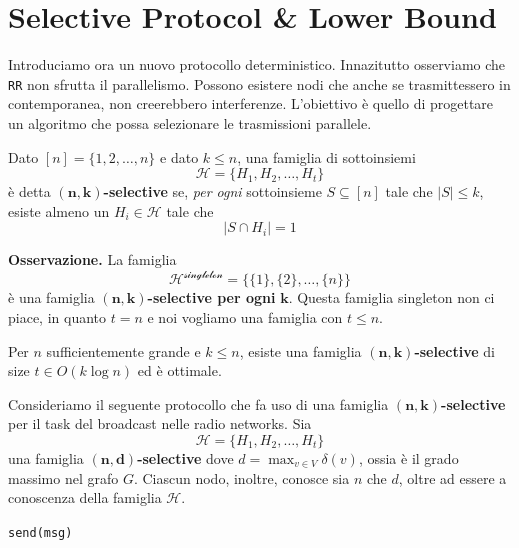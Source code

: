 \section{Selective Protocol \& Lower Bound}

Introduciamo ora un nuovo protocollo deterministico. Innazitutto osserviamo che \texttt{RR} non sfrutta il parallelismo. Possono esistere nodi che anche se trasmittessero in contemporanea, non creerebbero interferenze. L'obiettivo è quello di progettare un algoritmo che possa selezionare le trasmissioni parallele.

\begin{definizione}
    Dato $[n] = \{1, 2, \dots, n\}$ e dato $k \leq n$, una famiglia di sottoinsiemi
    \[
        \mathcal{H} = \{ H_1, H_2, \dots, H_t \}
    \]
    è detta $\mathbf{(n,k)}$\textbf{-selective} se, \textit{per ogni} sottoinsieme $S \subseteq [n]$ tale che $|S| \leq k$, esiste almeno un $H_i \in \mathcal{H}$ tale che
    \[
        |S \cap H_i| = 1
    \]
\end{definizione}

\textbf{Osservazione.} La famiglia 
\[
    \mathcal{H^{\text{singleton}}} = \{ \{1\}, \{2\}, \dots, \{n\} \}
\]
è una famiglia $\mathbf{(n,k)}$\textbf{-selective per ogni }$\mathbf{k}$. Questa famiglia singleton non ci piace, in quanto $t = n$ e noi vogliamo una famiglia con $t \leq n$.

\begin{teorema}[ClementiMontiSilvestri]
    Per $n$ sufficientemente grande e $k \leq n$, esiste una famiglia $\mathbf{(n,k)}$\textbf{-selective} di size $t \in O(k \log n)$ ed è ottimale.
\end{teorema}

Consideriamo il seguente protocollo che fa uso di una famiglia $\mathbf{(n,k)}$\textbf{-selective} per il task del broadcast nelle radio networks. Sia
\[
    \mathcal{H} = \{ H_1, H_2, \dots, H_t \}
\]
una famiglia $\mathbf{(n,d)}$\textbf{-selective} dove $d = \max_{v \in V} \delta(v)$, ossia è il grado massimo nel grafo $G$. Ciascun nodo, inoltre, conosce sia $n$ che $d$, oltre ad essere a conoscenza della famiglia $\mathcal{H}$.

\begin{algorithm}
\caption{Selective Protocol}
\begin{algorithmic}[1]
                \State \texttt{send(msg)}
            \EndIf
        \EndFor
    \EndFor
\EndFor
\end{algorithmic}
\end{algorithm}

